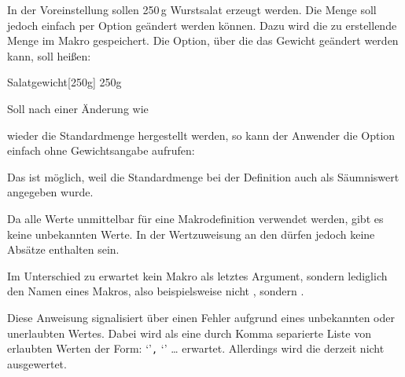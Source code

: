 \begin{Example}
  In der Voreinstellung sollen 250\,g Wurstsalat erzeugt werden. Die Menge
  soll jedoch einfach per Option geändert werden können. Dazu wird die zu
  erstellende Menge im Makro  gespeichert. Die Option,
  über die das Gewicht geändert werden kann, soll \iffalse ebenfalls \fi
   heißen:
\begin{lstcode}
  \newcommand*{\Salatgewicht}{250g}
                  {Salatgewicht}[250g]%
                  {\Salatgewicht}
\end{lstcode}
  Soll nach einer Änderung
  \iftrue%
  wie
\begin{lstcode}
\end{lstcode}
  \fi%
  wieder die Standardmenge hergestellt
  werden, so kann der Anwender die Option einfach ohne Gewichtsangabe
  aufrufen:
\begin{lstcode}
\end{lstcode}
  Das ist möglich, weil die Standardmenge bei der Definition auch als
  Säumniswert angegeben wurde.
\end{Example}
Da alle Werte unmittelbar für eine Makrodefinition verwendet werden, gibt es
keine unbekannten Werte. In der Wertzuweisung an den  dürfen
jedoch keine Absätze enthalten sein.

Im Unterschied zu 
erwartet  kein Makro als letztes Argument, sondern
lediglich den Namen eines Makros, also beispielsweise nicht
, sondern .%
%
\EndIndexGroup


\begin{Declaration}
\end{Declaration}
Diese Anweisung signalisiert über 
einen Fehler aufgrund eines unbekannten oder unerlaubten Wertes. Dabei wird
als  eine durch Komma separierte Liste von erlaubten Werten
der Form:
    `'\texttt{,} `' \dots{}
erwartet. Allerdings wird die
 derzeit nicht ausgewertet.

